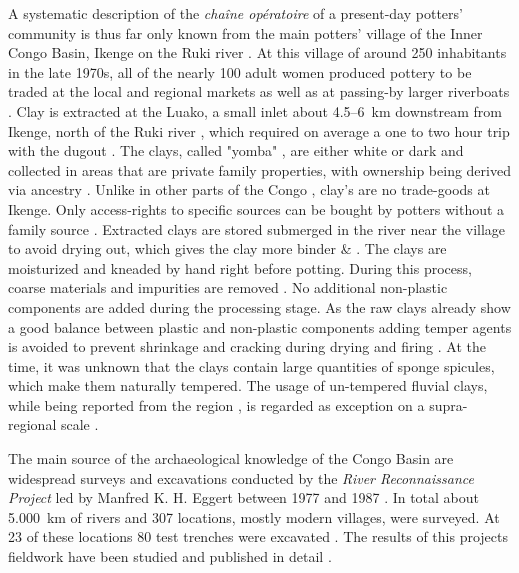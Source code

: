 \documentclass[preprint,10pt,oneside,onecolumn,authoryear]{elsarticle}
\begin{document}
A systematic description of the \textit{chaîne opératoire} of a present-day potters' community is thus far only known from the main potters' village of the Inner Congo Basin, Ikenge on the Ruki river \citep{Eggert.1980c,Wotzka.1991,KanimbaMisago.1992a}. At this village of around 250 inhabitants in the late 1970s, all of the nearly 100 adult women produced pottery to be traded at the local and regional markets as well as at passing-by larger riverboats \citep{Eggert.1991}. Clay is extracted at the Luako, a small inlet about 4.5--6~km downstream from Ikenge, north of the Ruki river \citep[389 Fig.~1]{Eggert.1980c}, which required on average a one to two hour trip with the dugout \citep[43]{KanimbaMisago.1992a}. The clays, called "yomba" \citep[33]{Engels.1912}, are either white or dark \citep[290]{Wotzka.1991} and collected in areas that are private family properties, with ownership being derived via ancestry \citep[396]{Eggert.1980c}. Unlike in other parts of the Congo \citep[33]{Coart.1907}, clay's are no trade-goods at Ikenge. Only access-rights to specific sources can be bought by potters without a family source \citep[396]{Eggert.1980c}. Extracted clays are stored submerged in the river near the village to avoid drying out, which gives the clay more binder \citep[33--34]{Coart.1907} \& \citep[29]{Maes.1937}. The clays are moisturized and kneaded by hand right before potting. During this process, coarse materials and impurities are removed \citep[397]{Eggert.1980c}. No additional non-plastic components are added during the processing stage. As the raw clays already show a good balance between plastic and non-plastic components adding temper agents is avoided to prevent shrinkage and cracking during drying and firing \citep[397]{Eggert.1980c}. At the time, it was unknown that the clays contain large quantities of sponge spicules, which make them naturally tempered. The usage of un-tempered fluvial clays, while being reported from the region \citep[35]{Coart.1907}, is regarded as exception on a supra-regional scale \citep[30-33]{Drost.1967}.

The main source of the archaeological knowledge of the Congo Basin are widespread surveys and excavations conducted by the \textit{River Reconnaissance Project} led by Manfred K. H. Eggert between 1977 and 1987 \citep{Eggert.1978,Eggert.1987d,Eggert.1983,Eggert.1984,Eggert.1984a,Eggert.1987a,Eggert.1992,Eggert.1993}. In total about 5.000~km of rivers and 307 locations, mostly modern villages, were surveyed. At 23 of these locations 80 test trenches were excavated \citep[295 Fig.~16.2]{Eggert.1993}. The results of this projects fieldwork have been studied and published in detail \citep{Wotzka.1995,Seidensticker.2021e}. 
\end{document}
